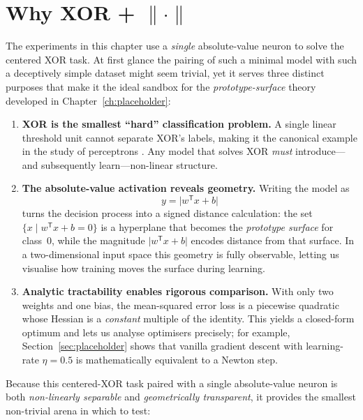﻿%
\section{Why XOR + $\|\cdot\|$}
\label{sec:abs1-motivation}

The experiments in this chapter use a \emph{single} absolute-value neuron to solve the centered XOR task.  At first glance the pairing of such a minimal model with such a deceptively simple dataset might seem trivial, yet it serves three distinct purposes that make it the ideal sandbox for the \textit{prototype-surface} theory developed in Chapter~\ref{ch:placeholder}:

\begin{enumerate}[leftmargin=*]

\item \textbf{XOR is the smallest ``hard'' classification problem.}
A single linear threshold unit cannot separate XOR’s labels, making it the canonical example in the study of perceptrons
\cite{minsky1969perceptrons}.  Any model that solves XOR \emph{must} introduce—and subsequently learn—non-linear structure.

\item \textbf{The absolute-value activation reveals geometry.}
Writing the model as
\[
y = \lvert w^{\mathsf T}x + b \rvert
\]
turns the decision process into a signed distance calculation: the set $\{x \mid w^{\mathsf T}x + b = 0\}$ is a hyperplane that becomes the \emph{prototype surface} for class~$0$, while the magnitude $\lvert w^{\mathsf T}x + b\rvert$ encodes distance from that surface. In a two-dimensional input space this geometry is fully observable, letting us visualise how training moves the surface during learning.

\item \textbf{Analytic tractability enables rigorous comparison.}
With only two weights and one bias, the mean-squared error loss is a piecewise quadratic whose Hessian is a \emph{constant} multiple of the identity.  This yields a closed-form optimum and lets us analyse
optimisers precisely; for example, Section~\ref{sec:placeholder} shows that vanilla gradient descent with learning-rate
$\eta = 0.5$ is mathematically equivalent to a Newton step.

\end{enumerate}

Because this centered-XOR task paired with a single absolute-value neuron is both \emph{non-linearly separable} and \emph{geometrically transparent}, it provides the smallest non-trivial arena in which to test:

